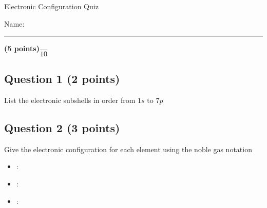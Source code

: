 \documentclass[12pt, letterpaper]{memoir}
\begin{document}
	\begin{center}
		{\large Electronic Configuration Quiz}
	\end{center}
	{\large Name: \rule[-1mm]{4in}{.1pt} {\bfseries (5 points)}\hspace{4em}$\dfrac{~}{10}$} 
	
	\subsection*{Question 1 (2 points)}
	List the electronic subshells in order from $1s$ to $7p$
	
	\vspace{10em}
	\subsection*{Question 2 (3 points)}
	Give the electronic configuration for each element using the noble gas notation
	
	\begin{itemize}
		\item {}:
		\item \vspace{4em} :
		\item \vspace{4em} :
	\end{itemize}


	
\end{document}

